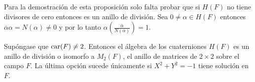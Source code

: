 \begin{proof*}
Para la demostración de esta proposición solo falta probar que si $H(F)$ no tiene divisores de cero entonces es un anillo de división. Sea $0 \neq \alpha \in H(F)$ entonces $\overline{\alpha}\alpha = N(\alpha) \neq 0$ y por lo tanto $\alpha\left( \frac{\overline{\alpha}}{N(\alpha)}\right) = 1$.
\end{proof*}

\begin{teorema}\label{teo:caracterizacion}
Supóngase que $\operatorname{car}(F) \neq 2$. Entonces el álgebra de los cuaterniones $H(F)$ es un anillo de división o isomorfo a $M_2(F)$, el anillo de matrices de $2\times 2$ sobre el campo $F$. La última opción sucede únicamente si $X^2 + Y^2 = -1$ tiene solución en~$F$.
\end{teorema}

